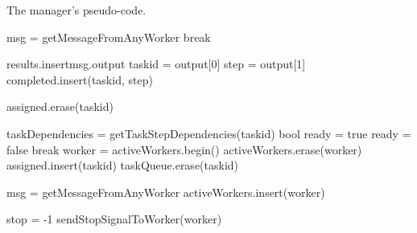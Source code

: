 \documentclass[a4paper,oneside,12pt]{article}
\begin{document}
\begin{algorithm}
\caption{The manager's pseudo-code.}
    \begin{algorithmic}[1] %



            \State msg = getMessageFromAnyWorker{}
              \State break
            \EndIf

            \Call results.insert{msg.output}
            \State taskid = output[0]
            \State step = output[1]
            \State completed.insert(taskid, step)

                \State assigned.erase(taskid)
            \EndIf
        \EndWhile

            \State taskDependencies = getTaskStepDependencies(taskid)
            \State bool ready = true
                    \State ready = false
                    \State break
                \EndIf
            \EndFor
                \State worker = activeWorkers.begin()
                \State activeWorkers.erase(worker)
                \State {}
                \State assigned.insert(taskid)
                \State taskQueue.erase(taskid)
            \EndIf
        \EndFor

            \State msg = getMessageFromAnyWorker{}
                \State activeWorkers.insert(worker)
            \EndIf
        \EndFor

    \EndWhile

    \State stop = -1
        \State sendStopSignalToWorker(worker)
    \EndFor

\end{algorithmic}
\label{algo:manager}
\end{algorithm}
\end{document}
